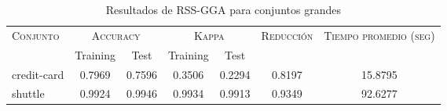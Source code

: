 \begin{table}[]
\centering
\begin{tabular}{l c c c c c c}
\hline
\multirow{2}{*}{\textsc{Conjunto}}
	& \multicolumn{2}{c}{\textsc{Accuracy}}
	& \multicolumn{2}{c}{\textsc{Kappa}}
	& \textsc{Reducción}
	& \textsc{Tiempo promedio (seg)} \\
	& Training & Test
	& Training & Test \\ 
\hline
\hline

credit-card & 0.7969 & 0.7596 & 0.3506 & 0.2294 & 0.8197 & 15.8795 \\
shuttle & 0.9924 & 0.9946 & 0.9934 & 0.9913 & 0.9349 & 92.6277 \\

\hline
\end{tabular}
\caption{Resultados de RSS-GGA para conjuntos grandes }
\label{res-grande-rss-gga}
\end{table}

